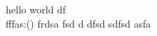 \documentclass{article}
\begin{document}
	hello world df \textbf{\gitRel}\\
	fffas:\gitRoff(\gitCommitterDate)
	\newpage
	frdsa fsd d dfsd sdfsd
	\newpage
	asfa
\end{document}
